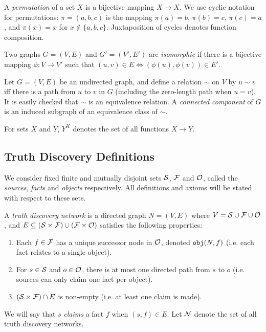 \documentclass[../main.tex]{subfiles}
\begin{document}
\begin{definition}
A \emph{permutation} of a set $X$ is a bijective mapping $X \rightarrow X$. We
use cyclic notation for permutations: $\pi=(a, b, c)$ is the mapping $\pi(a) =
b$, $\pi(b) = c$, $\pi(c) = a$, and $\pi(x) = x$ for $x \notin \{a, b, c\}$.
Juxtaposition of cycles denotes function composition.
\end{definition}

\begin{definition}

Two graphs $G=(V, E)$ and $G'=(V', E')$ are \emph{isomorphic} if there is a
bijective mapping $\phi: V \rightarrow V'$ such that $(u, v) \in E \iff
(\phi(u), \phi(v)) \in E'$.

\end{definition}

\begin{definition}
Let $G=(V, E)$ be an undirected graph, and define a relation $\sim$ on $V$ by
$u \sim v$ iff there is a path from $u$ to $v$ in $G$ (including the
zero-length path when $u = v$). It is easily checked that $\sim$ is an
equivalence relation. A \emph{connected component} of $G$ is an induced
subgraph of an equivalence class of $\sim$.
\end{definition}

\begin{notation}
For sets $X$ and $Y$, $Y^X$ denotes the set of all functions $X \rightarrow Y$.
\end{notation}

\subsection{Truth Discovery Definitions}

We consider fixed finite and mutually disjoint sets $\S$, $\F$ and $\O$, called
the \emph{sources}, \emph{facts} and \emph{objects} respectively. All
definitions and axioms will be stated with respect to these sets.

\begin{definition}

A \emph{truth discovery network} is a directed graph $N = (V, E)$ where $V = \S
\cup \F \cup \O$, and $E \subseteq (\S \times \F) \cup (\F \times \O)$
satisfies the following properties:

\begin{enumerate}
\item Each $f \in \F$ has a unique successor node in $\O$, denoted $\obj(N, f)$
(i.e. each fact relates to a single object).

\item For $s \in \S$ and $o \in \O$, there is at most one directed path from
$s$ to $o$ (i.e. sources can only claim one fact per object).

\item $(\S \times \F) \cap E$ is non-empty (i.e. at least one claim is made).

\end{enumerate}
We will say that $s$ \emph{claims} a fact $f$ when $(s, f) \in E$. Let $\N$
denote the set of all truth discovery networks.
\end{definition}
\end{document}
